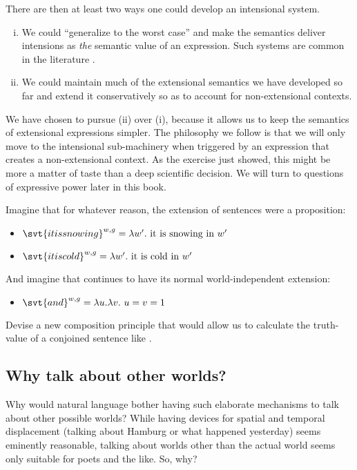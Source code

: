 \noindent There are then at least two ways one could develop an
intensional system.
\begin{enumerate}
	[(i)] 
\item We could ``generalize to the worst case'' and make the semantics deliver
  intensions as \emph{the} semantic value of an expression. Such systems are
  common in the literature
  \citep[see][]{lewis-1970-general-semantics,cresswell-1973-logics}.
\item We could maintain much of the extensional semantics we have developed so
  far and extend it conservatively so as to account for non-extensional
  contexts.
	
\end{enumerate}
%
We have chosen to pursue (ii) over (i), because it allows us to keep the
semantics of extensional expressions simpler. The philosophy we follow is that
we will only move to the intensional sub-machinery when triggered by an
expression that creates a non-extensional context. As the exercise just showed,
this might be more a matter of taste than a deep scientific decision. We will
turn to questions of expressive power later in this book.

\begin{exercise}
  Imagine that for whatever reason, the extension of sentences were a proposition:
  \begin{itemize}
  \item $\svt{it is snowing}^{w,g} = \lambda w'.\text{ it is snowing in }w'$
  \item $\svt{it is cold}^{w,g} = \lambda w'.\text{ it is cold in }w'$ 
  \end{itemize}
  And imagine that  continues to have its normal
  world-independent extension:
  \begin{itemize}
  \item $\svt{and}^{w,g} = \lambda u.\lambda v.\ u=v=1$
  \end{itemize}
  Devise a new composition principle that would allow us to calculate the
  truth-value of a conjoined sentence like .
\end{exercise}

\subsection{Why talk about other worlds?} \label{sec:why-talk-about}

Why would natural language bother having such elaborate mechanisms to talk about
other possible worlds? While having devices for spatial and temporal
displacement (talking about Hamburg or what happened yesterday) seems eminently
reasonable, talking about worlds other than the actual world seems only suitable
for poets and the like. So, why?

